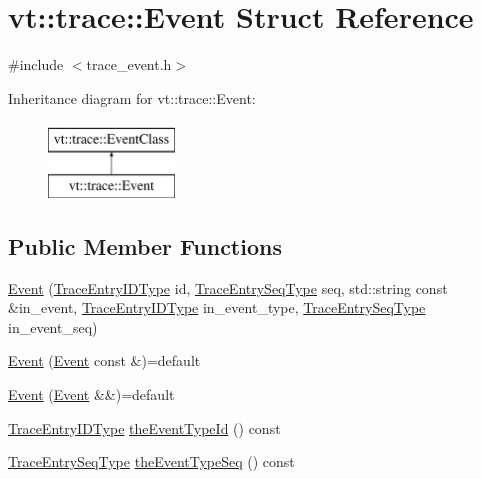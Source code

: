 \hypertarget{structvt_1_1trace_1_1_event}{}\section{vt\+:\+:trace\+:\+:Event Struct Reference}
\label{structvt_1_1trace_1_1_event}


{\ttfamily \#include $<$trace\+\_\+event.\+h$>$}

Inheritance diagram for vt\+:\+:trace\+:\+:Event\+:\begin{figure}[H]
\begin{center}
\leavevmode
\includegraphics[height=2.000000cm]{structvt_1_1trace_1_1_event}
\end{center}
\end{figure}
\subsection*{Public Member Functions}
\begin{DoxyCompactItemize}
\item 
\hyperlink{structvt_1_1trace_1_1_event_a6453f6c296f047b7caa653212c09da06}{Event} (\hyperlink{namespacevt_1_1trace_a3c14050715ba9eceaeff51fb3de64f2f}{Trace\+Entry\+I\+D\+Type} id, \hyperlink{namespacevt_1_1trace_a522028dd2a7d056f0ec3d417836fdecd}{Trace\+Entry\+Seq\+Type} seq, std\+::string const \&in\+\_\+event, \hyperlink{namespacevt_1_1trace_a3c14050715ba9eceaeff51fb3de64f2f}{Trace\+Entry\+I\+D\+Type} in\+\_\+event\+\_\+type, \hyperlink{namespacevt_1_1trace_a522028dd2a7d056f0ec3d417836fdecd}{Trace\+Entry\+Seq\+Type} in\+\_\+event\+\_\+seq)
\item 
\hyperlink{structvt_1_1trace_1_1_event_a4c9c1f89d57a79f7b51f16fd31ae578a}{Event} (\hyperlink{structvt_1_1trace_1_1_event}{Event} const \&)=default
\item 
\hyperlink{structvt_1_1trace_1_1_event_a286fcf42a1068659e4ce6429c604a8ec}{Event} (\hyperlink{structvt_1_1trace_1_1_event}{Event} \&\&)=default
\item 
\hyperlink{namespacevt_1_1trace_a3c14050715ba9eceaeff51fb3de64f2f}{Trace\+Entry\+I\+D\+Type} \hyperlink{structvt_1_1trace_1_1_event_aa977fc8868e6807f1bcf1df8bdc15588}{the\+Event\+Type\+Id} () const
\item 
\hyperlink{namespacevt_1_1trace_a522028dd2a7d056f0ec3d417836fdecd}{Trace\+Entry\+Seq\+Type} \hyperlink{structvt_1_1trace_1_1_event_a8479476d6d9a816d78d0a341df438626}{the\+Event\+Type\+Seq} () const
\end{DoxyCompactItemize}


